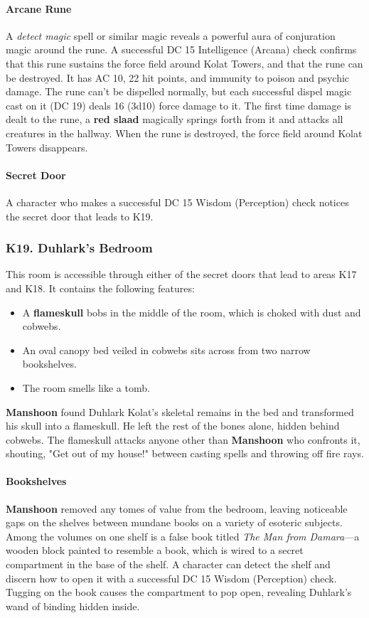\documentclass[10pt,a4paper,twoside,twocolumn,openany,nodeprecatedcode]{dndbook}
\begin{document}
\paragraph{Arcane Rune}
A \textit{detect magic} spell or similar magic reveals a powerful aura of conjuration magic around the rune. A successful DC 15 Intelligence (Arcana) check confirms that this rune sustains the force field around Kolat Towers, and that the rune can be destroyed. It has AC 10, 22 hit points, and immunity to poison and psychic damage. The rune can't be dispelled normally, but each successful dispel magic cast on it (DC 19) deals 16 (3d10) force damage to it.
The first time damage is dealt to the rune, a \textbf{red slaad} magically springs forth from it and attacks all creatures in the hallway.
When the rune is destroyed, the force field around Kolat Towers disappears.
\paragraph{Secret Door}
A character who makes a successful DC 15 Wisdom (Perception) check notices the secret door that leads to K19.
\subsubsection{K19. Duhlark's Bedroom}
This room is accessible through either of the secret doors that lead to areas K17 and K18. It contains the following features:
\begin{itemize}

\item A \textbf{flameskull} bobs in the middle of the room, which is choked with dust and cobwebs.
\item An oval canopy bed veiled in cobwebs sits across from two narrow bookshelves.
\item The room smells like a tomb.
\end{itemize}


\textbf{Manshoon} found Duhlark Kolat's skeletal remains in the bed and transformed his skull into a flameskull. He left the rest of the bones alone, hidden behind cobwebs. The flameskull attacks anyone other than \textbf{Manshoon} who confronts it, shouting, "Get out of my house!" between casting spells and throwing off fire rays.
\paragraph{Bookshelves}
\textbf{Manshoon} removed any tomes of value from the bedroom, leaving noticeable gaps on the shelves between mundane books on a variety of esoteric subjects.
Among the volumes on one shelf is a false book titled \textit{The Man from Damara}—a wooden block painted to resemble a book, which is wired to a secret compartment in the base of the shelf. A character can detect the shelf and discern how to open it with a successful DC 15 Wisdom (Perception) check. Tugging on the book causes the compartment to pop open, revealing Duhlark's wand of binding hidden inside.
\end{document}

